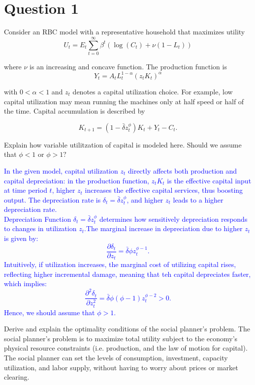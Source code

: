 \section*{Question 1}

Consider an RBC model with a representative household that maximizes utility
$$U_t=E_t\sum_{t=0}^\infty\beta^t\left(\log\left(C_t\right)+\nu\left(1-L_t\right)\right)$$


where $\nu$ is an increasing and concave function. The production function is
$$Y_t=A_tL_t^{1-\alpha}\left(z_tK_t\right)^\alpha $$

with $0<\alpha<1$ and $z_t$ denotes a capital utilization choice. For example, low capital utilization may mean
running the machines only at half speed or half of the time.
Capital accumulation is described by

$$K_{t+1}=\left(1-\bar{\delta}z_t^\phi\right)K_t+Y_t-C_t.$$

\begin{problem*}[1]
    Explain how variable utilitzation of capital is modeled here. Should we assume that $\phi<1$ or $\phi>1?$
\end{problem*}

\begin{solution}
    \textcolor{blue}{
        In the given model, capital utilization $z_t$ directly affects both production and capital depreciation: in the production function, $z_t K_t$ is the effective capital input at time period $t$, higher $z_t$ increases the effective capital services, thus boosting output. The depreciation rate is $\delta_t = \bar{\delta}z_t^{\phi}$, and higher $z_t$ leads to a higher depreciation rate. \\
        Depreciation Function $\delta_t = \bar{\delta}z_t^{\phi}$ determines how sensitively depreciation responds to changes in utilization $z_t$.The marginal increase in depreciation due to higher $z_t$ is given by: 
        \[
        \frac{\partial \delta_t}{\partial z_t} = \bar{\delta}\phi z_t^{\phi-1}.
        \]
        Intuitively, if utilization increases, the marginal cost of utilizing capital rises, reflecting higher incremental damage, meaning that teh capital depreciates faster, which implies:
        \[
        \frac{\partial^2 \delta_t}{\partial z_t^2} = \bar{\delta}\phi(\phi-1) z_t^{\phi-2} > 0.
        \]
        Hence, we should assume that $\phi > 1.$
    }
\end{solution}

\begin{problem*}[2]
    Derive and explain the optimality conditions of the social planner's problem. 
    The social planner's problem is to maximize total utility subject to the economy's physical resource constraints 
    (i.e. production, and the law of motion for capital). 
    The social planner can set the levels of consumption, investment, capacity utilization, and labor supply, 
    without having to worry about prices or market clearing. 
\end{problem*}

